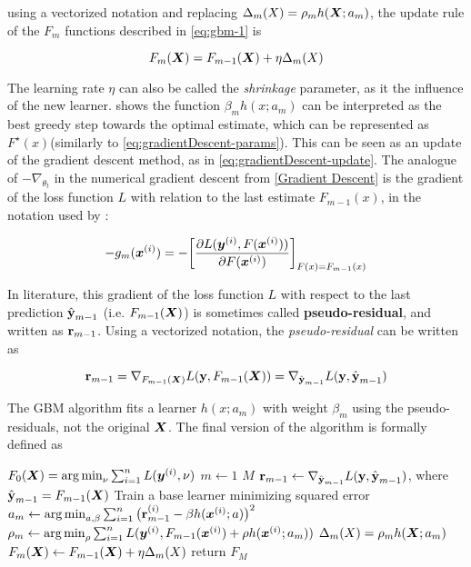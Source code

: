 using a vectorized notation and replacing $\Delta_m(X) =\rho_m h(\bm{X}; a_m)$,  the update rule of the $F_m$ functions described in \ref{eq:gbm-1} is

\begin{equation}\label{eq:gbm-eta}
    F_m(\bm{X}) = F_{m-1}(\bm{X}) + \eta \Delta_m(X)
\end{equation}

The learning rate $\eta$ can also be called the \textit{shrinkage} parameter, as it  the influence of the new learner. \cite{gbmdef} shows the function $\beta_mh(x; a_m)$ can be interpreted as the best greedy step towards the optimal estimate, which can be represented as $F^\star(x)$(similarly to \ref{eq:gradientDescent-params}). This can be seen as an update of the gradient descent method, as in \ref{eq:gradientDescent-update}. The analogue of $-\nabla_{\theta_{t}}$ in the numerical gradient descent from \ref{Gradient Descent} is the gradient of the loss function $L$ with relation to the last estimate $F_{m-1}(x)$, in the notation used by \cite{gbmdef}:

\begin{equation*}
    -g_m(\bm{x}^{(i)}) = -\bigg[\frac{\partial L(\bm{y}^{(i)}, F(\bm{x}^{(i)}))}{\partial F(\bm{x}^{(i)})}\bigg]_{F(x)=F_{m-1}(x)}
\end{equation*}

In literature, this gradient of the loss function $L$ with respect to the last prediction $\hat{\textbf{{\text{\textup{y}}}}}_{m-1}$ (i.e. $F_{m-1}(\bm{X})$) is sometimes called \textbf{pseudo-residual}, and written as $\textbf{{\text{\textup{r}}}}_{m-1}$. Using a vectorized notation, the \textit{pseudo-residual} can be written as

\begin{equation*}
    \textbf{{\text{\textup{r}}}}_{m-1} = \nabla_{F_{m-1}(\bm{X})}L(\textbf{\text{\textup{y}}}, F_{m-1}(\bm{X})) = \nabla_{\hat{\textbf{{\text{\textup{y}}}}}_{m-1}}L(\textbf{\text{\textup{y}}},\hat{\textbf{{\text{\textup{y}}}}}_{m-1})
\end{equation*}


The GBM algorithm fits a learner $h(x; a_m)$ with weight $\beta_m$ using the pseudo-residuals, not the original $\bm{X}$. The final version of the algorithm is formally defined as

\begin{codebox}
    \li $F_0(\bm{X}) = \operatorname*{arg\,min}_{\nu}\sum_{i=1}^n L(\bm{y}^{(i)}, \nu)$
    \li \For $m \gets 1$ \To $M$
    \li     \Do
                $\textbf{{\text{\textup{r}}}}_{m-1} \gets \nabla_{\hat{\textbf{{\text{\textup{y}}}}}_{m-1}}L(\textbf{\text{\textup{y}}},\hat{\textbf{{\text{\textup{y}}}}}_{m-1})$, where $\hat{\textbf{{\text{\textup{y}}}}}_{m-1}=F_{m-1}(\bm{X})$
    \li         \Comment Train a base learner minimizing squared error
    \li         $a_m \gets \operatorname*{arg\,min}_{a, \beta}\sum_{i=1}^n\big(\textbf{{\text{\textup{r}}}}_{m-1}^{(i)}-\beta h(\bm{x}^{(i)};a)\big)^2$
    \li         $\rho_m \gets \operatorname*{arg\,min}_{\rho}\sum_{i=1}^n L(\bm{y}^{(i)}, F_{m-1}(\bm{x}^{(i)}) + \rho h(\bm{x}^{(i)};a_m))$
    \li         $\Delta_m(X) =\rho_m h(\bm{X}; a_m)$
    \li         $F_m(\bm{X}) \gets F_{m-1}(\bm{X}) + \eta \Delta_m(X)$
            \End
    \li return $F_M$
    \end{codebox}
    
